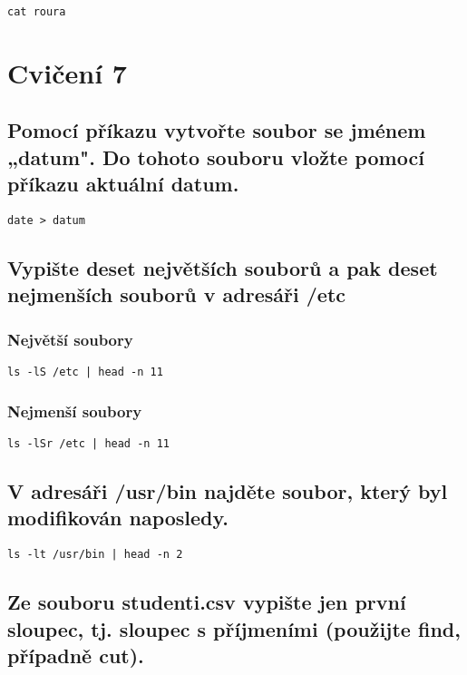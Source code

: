 \documentclass{article}
\begin{document}
\begin{lstlisting}
cat roura
\end{lstlisting}

\section{Cvičení 7}
\subsection{Pomocí příkazu vytvořte soubor se jménem „datum". Do tohoto souboru vložte pomocí příkazu aktuální datum.}

\begin{lstlisting}
date > datum
\end{lstlisting}

\subsection{Vypište deset největších souborů a pak deset nejmenších souborů v adresáři /etc}

\subsubsection{Největší soubory}

\begin{lstlisting}
ls -lS /etc | head -n 11
\end{lstlisting}

\subsubsection{Nejmenší soubory}

\begin{lstlisting}
ls -lSr /etc | head -n 11
\end{lstlisting}

\subsection{V adresáři /usr/bin najděte soubor, který byl modifikován naposledy.}

\begin{lstlisting}
ls -lt /usr/bin | head -n 2
\end{lstlisting}

\subsection{Ze souboru studenti.csv vypište jen první sloupec, tj. sloupec s příjmeními (použijte find, případně cut).}
\end{document}
